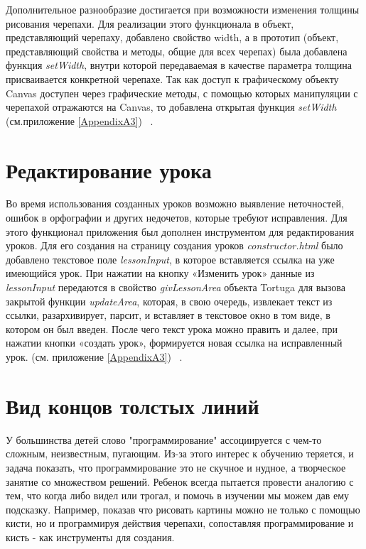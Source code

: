 Дополнительное разнообразие достигается при возможности изменения толщины рисования черепахи. Для реализации этого функционала в объект, представляющий черепаху, добавлено свойство width, а в прототип (объект, представляющий свойства и методы, общие для всех черепах) была добавлена функция \textit{setWidth}, внутри которой передаваемая в качестве параметра толщина присваивается конкретной черепахе. Так как доступ к графическому объекту Canvas доступен через графические методы, с помощью которых манипуляции с черепахой отражаются на Canvas, то добавлена открытая функция \textit{setWidth} (см.приложение \ref{AppendixA3}) ~\cite{prototype}.

\chapter{Редактирование урока} \label{chapt1}

Во время использования созданных уроков возможно выявление  неточностей, ошибок в орфографии и других недочетов, которые требуют исправления. Для этого функционал приложения был дополнен инструментом для редактирования уроков. Для его создания на страницу создания уроков \textit{constructor.html} было добавлено текстовое поле \textit{lessonInput}, в которое вставляется ссылка на уже имеющийся урок. При нажатии на кнопку «Изменить урок» данные из \textit{lessonInput} передаются в свойство \textit{givLessonArea} объекта Tortuga для вызова закрытой функции \textit{updateArea}, которая, в свою очередь,  извлекает текст из ссылки, разархивирует, парсит, и вставляет в текстовое окно в том виде, в котором он был введен. После чего текст урока можно править и далее, при нажатии кнопки «создать урок», формируется новая ссылка на исправленный урок. (см. приложение \ref{AppendixA3}) ~\cite{elementsdom, string}.


\chapter{Вид концов толстых линий} \label{chapt1}
У большинства детей  слово "программирование" ассоциируется с чем-то сложным, неизвестным, пугающим. Из-за этого интерес к обучению теряется, и задача показать, что программирование это не скучное и нудное, а творческое занятие со множеством решений. Ребенок всегда пытается провести аналогию с тем, что когда либо видел или трогал, и помочь в изучении мы можем дав ему подсказку. Например, показав что рисовать картины можно не только с помощью  кисти, но и программируя действия черепахи, сопоставляя программирование и  кисть -  как инструменты для создания.


